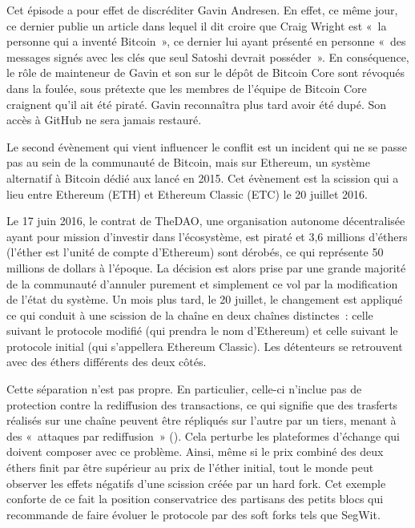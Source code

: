 Cet épisode a pour effet de discréditer Gavin Andresen. En effet, ce même jour, ce dernier publie un article dans lequel il dit croire que Craig Wright est «~la personne qui a inventé Bitcoin~», ce dernier lui ayant présenté en personne «~des messages signés avec les clés que seul Satoshi devrait posséder~». En conséquence, le rôle de mainteneur de Gavin et son  sur le dépôt de Bitcoin Core sont révoqués dans la foulée, sous prétexte que les membres de l'équipe de Bitcoin Core craignent qu'il ait été piraté. Gavin reconnaîtra plus tard avoir été dupé. Son accès à GitHub ne sera jamais restauré.

Le second évènement qui vient influencer le conflit est un incident qui ne se passe pas au sein de la communauté de Bitcoin, mais sur Ethereum, un système alternatif à Bitcoin dédié aux  lancé en 2015. Cet évènement est la scission qui a lieu entre Ethereum (ETH) et Ethereum Classic (ETC) le 20 juillet 2016.

Le 17 juin 2016, le contrat de TheDAO, une organisation autonome décentralisée ayant pour mission d'investir dans l'écosystème, est piraté et 3,6 millions d'éthers (l'éther est l'unité de compte d'Ethereum) sont dérobés, ce qui représente 50 millions de dollars à l'époque. La décision est alors prise par une grande majorité de la communauté d'annuler purement et simplement ce vol par la modification de l'état du système. Un mois plus tard, le 20 juillet, le changement est appliqué ce qui conduit à une scission de la chaîne en deux chaînes distinctes~: celle suivant le protocole modifié (qui prendra le nom d'Ethereum) et celle suivant le protocole initial (qui s'appellera Ethereum Classic). Les détenteurs se retrouvent avec des éthers différents des deux côtés.

Cette séparation n'est pas propre. En particulier, celle-ci n'inclue pas de protection contre la rediffusion des transactions, ce qui signifie que des trasferts réalisés sur une chaîne peuvent être répliqués sur l'autre par un tiers, menant à des «~attaques par rediffusion~» (). Cela perturbe les plateformes d'échange qui doivent composer avec ce problème. Ainsi, même si le prix combiné des deux éthers finit par être supérieur au prix de l'éther initial, tout le monde peut observer les effets négatifs d'une scission créée par un hard fork. Cet exemple conforte de ce fait la position conservatrice des partisans des petits blocs qui recommande de faire évoluer le protocole par des soft forks tels que SegWit. 

